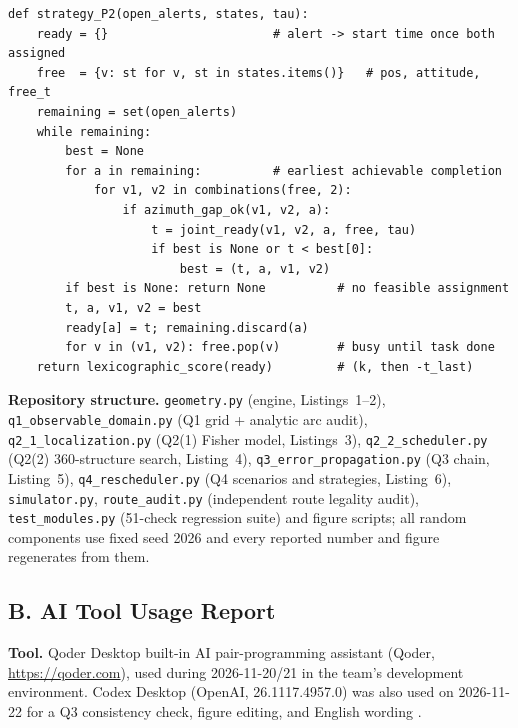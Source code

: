 \begin{lstlisting}[caption={Q4: rule-based strategy P2 (earliest-completion greedy;
AI-assisted implementation, rule designed by the team).},label={lst:p2}]
def strategy_P2(open_alerts, states, tau):
    ready = {}                       # alert -> start time once both assigned
    free  = {v: st for v, st in states.items()}   # pos, attitude, free_t
    remaining = set(open_alerts)
    while remaining:
        best = None
        for a in remaining:          # earliest achievable completion
            for v1, v2 in combinations(free, 2):
                if azimuth_gap_ok(v1, v2, a):
                    t = joint_ready(v1, v2, a, free, tau)
                    if best is None or t < best[0]:
                        best = (t, a, v1, v2)
        if best is None: return None          # no feasible assignment
        t, a, v1, v2 = best
        ready[a] = t; remaining.discard(a)
        for v in (v1, v2): free.pop(v)        # busy until task done
    return lexicographic_score(ready)         # (k, then -t_last)
\end{lstlisting}

\textbf{Repository structure.} \texttt{geometry.py} (engine, Listings~1--2),
\texttt{q1\_observable\_domain.py} (Q1 grid + analytic arc audit),
\texttt{q2\_1\_localization.py} (Q2(1) Fisher model, Listings~3),
\texttt{q2\_2\_scheduler.py} (Q2(2) 360-structure search, Listing~4),
\texttt{q3\_error\_propagation.py} (Q3 chain, Listing~5),
\texttt{q4\_rescheduler.py} (Q4 scenarios and strategies, Listing~6),
\texttt{simulator.py}, \texttt{route\_audit.py} (independent route legality audit),
\texttt{test\_modules.py} (51-check regression suite) and figure scripts; all random
components use fixed seed 2026 and every reported number and figure regenerates from
them.

\subsection*{B. AI Tool Usage Report}

\noindent\textbf{Tool.} Qoder Desktop built-in AI pair-programming assistant
(Qoder, \url{https://qoder.com}), used during 2026-11-20/21 in the team's development
environment. Codex Desktop (OpenAI, 26.1117.4957.0) was also used on 2026-11-22
for a Q3 consistency check, figure editing, and English wording \cite{codex2026}.

